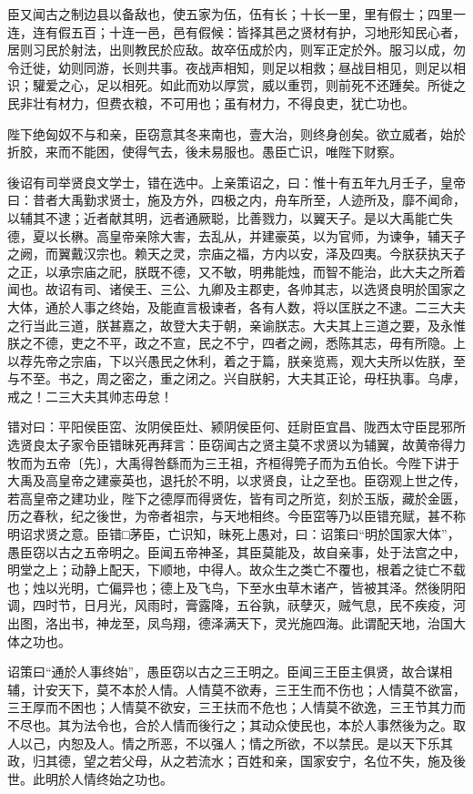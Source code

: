 \documentclass[UTF8,titlepage,oneside]{ctexbook}
\begin{document}
臣又闻古之制边县以备敌也，使五家为伍，伍有长；十长一里，里有假士；四里一连，连有假五百；十连一邑，邑有假候：皆择其邑之贤材有护，习地形知民心者，居则习民於射法，出则教民於应敌。故卒伍成於内，则军正定於外。服习以成，勿令迁徙，幼则同游，长则共事。夜战声相知，则足以相救；昼战目相见，则足以相识；驩爱之心，足以相死。如此而劝以厚赏，威以重罚，则前死不还踵矣。所徙之民非壮有材力，但费衣粮，不可用也；虽有材力，不得良吏，犹亡功也。

陛下绝匈奴不与和亲，臣窃意其冬来南也，壹大治，则终身创矣。欲立威者，始於折胶，来而不能困，使得气去，後未易服也。愚臣亡识，唯陛下财察。

後诏有司举贤良文学士，错在选中。上亲策诏之，曰：惟十有五年九月壬子，皇帝曰：昔者大禹勤求贤士，施及方外，四极之内，舟车所至，人迹所及，靡不闻命，以辅其不逮；近者献其明，远者通厥聪，比善戮力，以翼天子。是以大禹能亡失德，夏以长楙。高皇帝亲除大害，去乱从，并建豪英，以为官师，为谏争，辅天子之阙，而翼戴汉宗也。赖天之灵，宗庙之福，方内以安，泽及四夷。今朕获执天子之正，以承宗庙之祀，朕既不德，又不敏，明弗能烛，而智不能治，此大夫之所着闻也。故诏有司、诸侯王、三公、九卿及主郡吏，各帅其志，以选贤良明於国家之大体，通於人事之终始，及能直言极谏者，各有人数，将以匡朕之不逮。二三大夫之行当此三道，朕甚嘉之，故登大夫于朝，亲谕朕志。大夫其上三道之要，及永惟朕之不德，吏之不平，政之不宣，民之不宁，四者之阙，悉陈其志，毋有所隐。上以荐先帝之宗庙，下以兴愚民之休利，着之于篇，朕亲览焉，观大夫所以佐朕，至与不至。书之，周之密之，重之闭之。兴自朕躬，大夫其正论，毋枉执事。乌虖，戒之！二三大夫其帅志毋怠！

错对曰：平阳侯臣窋、汝阴侯臣灶、颍阴侯臣何、廷尉臣宜昌、陇西太守臣昆邪所选贤良太子家令臣错昧死再拜言：臣窃闻古之贤主莫不求贤以为辅翼，故黄帝得力牧而为五帝〔先〕，大禹得咎繇而为三王祖，齐桓得筦子而为五伯长。今陛下讲于大禹及高皇帝之建豪英也，退托於不明，以求贤良，让之至也。臣窃观上世之传，若高皇帝之建功业，陛下之德厚而得贤佐，皆有司之所览，刻於玉版，藏於金匮，历之春秋，纪之後世，为帝者祖宗，与天地相终。今臣窋等乃以臣错充赋，甚不称明诏求贤之意。臣错□茅臣，亡识知，昧死上愚对，曰：诏策曰“明於国家大体”，愚臣窃以古之五帝明之。臣闻五帝神圣，其臣莫能及，故自亲事，处于法宫之中，明堂之上；动静上配天，下顺地，中得人。故众生之类亡不覆也，根着之徒亡不载也；烛以光明，亡偏异也；德上及飞鸟，下至水虫草木诸产，皆被其泽。然後阴阳调，四时节，日月光，风雨时，膏露降，五谷孰，祆孽灭，贼气息，民不疾疫，河出图，洛出书，神龙至，凤鸟翔，德泽满天下，灵光施四海。此谓配天地，治国大体之功也。

诏策曰“通於人事终始”，愚臣窃以古之三王明之。臣闻三王臣主俱贤，故合谋相辅，计安天下，莫不本於人情。人情莫不欲寿，三王生而不伤也；人情莫不欲富，三王厚而不困也；人情莫不欲安，三王扶而不危也；人情莫不欲逸，三王节其力而不尽也。其为法令也，合於人情而後行之；其动众使民也，本於人事然後为之。取人以己，内恕及人。情之所恶，不以强人；情之所欲，不以禁民。是以天下乐其政，归其德，望之若父母，从之若流水；百姓和亲，国家安宁，名位不失，施及後世。此明於人情终始之功也。
\end{document}
